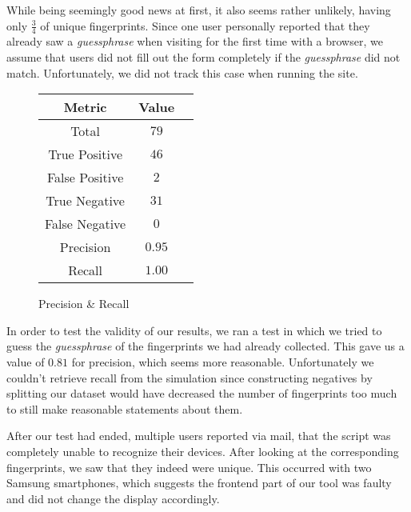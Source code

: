 While being seemingly good news at first, it also seems rather unlikely, having only $\frac{3}{4}$ of unique fingerprints. Since one user personally reported that they already saw a \emph{guessphrase} when visiting for the first time with a browser, we assume that users did not fill out the form completely if the \emph{guessphrase} did not match. Unfortunately, we did not track this case when running the site. 
\begin{wrapfigure}{r}{0.4\linewidth}
\centering
\begin{tabular}{|c|c|c|}
\hline
Metric & Value \\ \hline
Total & $79$\\\hline
True Positive & $46$\\\hline
False Positive & $2$\\\hline
True Negative & $31$\\ \hline
False Negative & $0$\\\hline \hline 
Precision & $0.95$ \\ \hline
Recall & $1.00$\\\hline
\end{tabular}
\caption{Precision \& Recall}
\label{fig:precrec}
\vspace{-0.25in}
\end{wrapfigure}
In order to test the validity of our results, we ran a test in which we tried to guess the \emph{guessphrase} of the fingerprints we had already collected. This gave us a value of $0.81$ for precision, which seems more reasonable. Unfortunately we couldn't retrieve recall from the simulation since constructing negatives by splitting our dataset would have decreased the number of fingerprints too much to still make reasonable statements about them.

After our test had ended, multiple users reported via mail, that the script was completely unable to recognize their devices. After looking at the corresponding fingerprints, we saw that they indeed were unique. This occurred with two Samsung smartphones, which suggests the frontend part of our tool was faulty and did not change the display accordingly. 